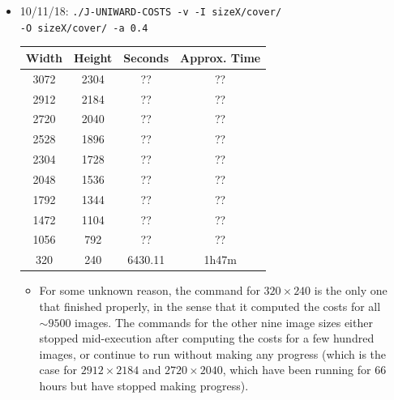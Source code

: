 \documentclass[11pt,a4paper]{report}
\begin{document}
\begin{itemize}
\item 10/11/18: \texttt{./J-UNIWARD-COSTS -v -I sizeX/cover/} \\
         \texttt{-O sizeX/cover/ -a 0.4}
  \begin{center}
  \begin{tabular}{ c c | c c }
  Width & Height & Seconds & Approx. Time \\ \hline
  3072 & 2304 & ?? & ?? \\  %
  2912 & 2184 & ?? & ?? \\  %
  2720 & 2040 & ?? & ?? \\  %
  2528 & 1896 & ?? & ?? \\  %
  2304 & 1728 & ?? & ?? \\  %
  2048 & 1536 & ?? & ?? \\  %
  1792 & 1344 & ?? & ?? \\  %
  1472 & 1104 & ?? & ?? \\  %
  1056 & 792 & ?? & ?? \\  %
  320 & 240 & 6430.11 & 1h47m \\
  \end{tabular}
  \end{center}

  \begin{itemize}
  \item For some unknown reason, the command for $320 \times 240$ is the only one that finished properly, in the sense that it computed the costs for all $\sim 9500$ images. The commands for the other nine image sizes either stopped mid-execution after computing the costs for a few hundred images, or continue to run without making any progress (which is the case for $2912 \times 2184$ and $2720 \times 2040$, which have been running for 66 hours but have stopped making progress).
  \end{itemize}


\end{itemize}
\end{document}
